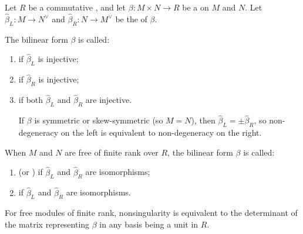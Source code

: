 \begin{definition} \label{definition:non_degenerate_nonsingular_perfect_bilinear_form_on_modules_over_a_commutative_ring}
    Let $R$ be a commutative , and let $\beta: M \times N \to R$ be a  on  $M$ and $N$. Let $\hat{\beta}_L: M \to N^\vee$ and $\hat{\beta}_R: N \to M^\vee$ be the  of $\beta$.

    The bilinear form $\beta$ is called:
    \begin{enumerate}
        \item {} if $\hat{\beta}_L$ is injective;
        \item {} if $\hat{\beta}_R$ is injective;
        \item {} if both $\hat{\beta}_L$ and $\hat{\beta}_R$ are injective.

        If $\beta$ is symmetric or skew-symmetric (so $M = N$), then $\hat{\beta}_L = \pm \hat{\beta}_R$, so non-degeneracy on the left is equivalent to non-degeneracy on the right.
    \end{enumerate}

    When $M$ and $N$ are free of finite rank over $R$, the bilinear form $\beta$ is called:
    \begin{enumerate}
        \item {} (or ) if $\hat{\beta}_L$ and $\hat{\beta}_R$ are isomorphisms;
        \item {} if $\hat{\beta}_L$ and $\hat{\beta}_R$ are isomorphisms.
    \end{enumerate}

    For free modules of finite rank, nonsingularity is equivalent to the determinant of the matrix representing $\beta$ in any basis being a unit in $R$.
\end{definition}
